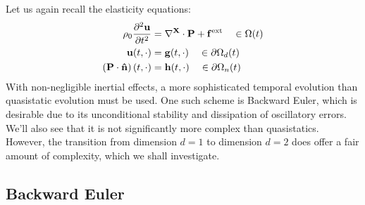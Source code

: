 Let us again recall the elasticity equations:
\begin{subequations}\label{eq:elasticity.ii}
\begin{align}
\rho_0 \frac{\partial^2 \mathbf{u}}{\partial t^2} & = \nabla^{\mathbf{X}} \cdot \mathbf{P} + \mathbf{f}^{\text{ext}} \quad \in \Omega(t) \\
\mathbf{u}(t,\cdot) & = \mathbf{g}(t,\cdot) \quad \in \partial \Omega_d(t) \\
\left( \mathbf{P} \cdot \mathbf{\hat{n}} \right) (t,\cdot) & = \mathbf{h}(t,\cdot) \quad \in \partial \Omega_n(t)
\end{align}
\end{subequations}
With non-negligible inertial effects, a more sophisticated temporal evolution than quasistatic evolution must be used. One such scheme is Backward Euler, which is desirable due to its unconditional stability and dissipation of oscillatory errors. We'll also see that it is not significantly more complex than quasistatics. However, the transition from dimension $d = 1$ to dimension $d = 2$ does offer a fair amount of complexity, which we shall investigate.

\subsection{Backward Euler}

